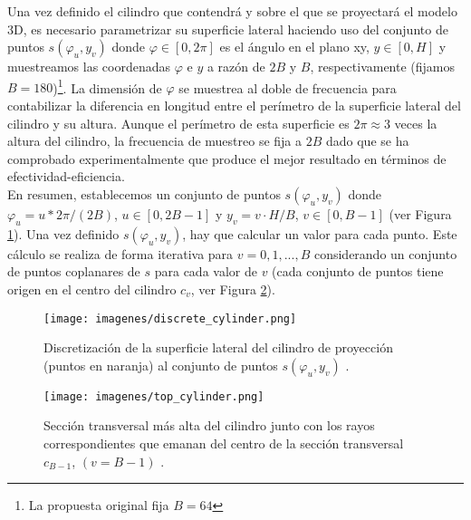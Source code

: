 Una vez definido el cilindro que contendrá y sobre el que se proyectará el modelo 3D, es necesario parametrizar su superficie lateral haciendo uso del conjunto de puntos $s(\varphi_u, y_v)$ donde $\varphi \in [0,2\pi]$ es el ángulo en el plano xy, $y \in [0,H]$ y muestreamos las coordenadas $\varphi$ e $y$ a razón de $2B$ y $B$, respectivamente (fijamos $B = 180$)\footnote{La propuesta original fija $B=64$}. La dimensión de $\varphi$ se muestrea al doble de frecuencia para contabilizar la diferencia en longitud entre el perímetro de la superficie lateral del cilindro y su altura. Aunque el perímetro de esta superficie es $2\pi \approx 3$ veces la altura del cilindro, la frecuencia de muestreo se fija a $2B$ dado que se ha comprobado experimentalmente que produce el mejor resultado en términos de efectividad-eficiencia.\\

En resumen, establecemos un conjunto de puntos $s(\varphi_u, y_v)$ donde $\varphi_u = u*2\pi / (2B)$, $u \in [0,2B-1]$ y $y_v = v \cdot H/B$, $v \in [0, B-1]$ (ver Figura \ref{fig:cilindro_discreto}). Una vez definido $s(\varphi_u, y_v)$, hay que calcular un valor para cada punto. Este cálculo se realiza de forma iterativa para $v = 0,1,...,B$ considerando un conjunto de puntos coplanares de $s$ para cada valor de $v$ (cada conjunto de puntos tiene origen en el centro del cilindro $c_v$, ver Figura \ref{fig:cilindro_top}).

\begin{figure}[ht]
    \centering
    \texttt{[image: imagenes/discrete\_cylinder.png]}
    \caption[Discretización de la superficie lateral del cilindro de proyección.]{Discretización de la superficie lateral del cilindro de proyección (puntos en naranja) al conjunto de puntos $s(\varphi_u, y_v)$ \cite{papadakis2010panorama}.}
    \label{fig:cilindro_discreto}
\end{figure}

\begin{figure}[ht]
    \centering
    \texttt{[image: imagenes/top\_cylinder.png]}
    \caption[Sección transversal más alta del cilindro junto con los rayos correspondientes.]{Sección transversal más alta del cilindro junto con los rayos correspondientes que emanan del centro de la sección transversal $c_{B-1}$, \mbox{$(v = B-1)$} \cite{papadakis2010panorama}.}
    \label{fig:cilindro_top}
\end{figure}

\newpage

